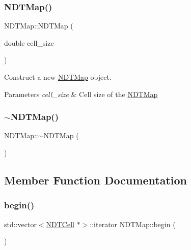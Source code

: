 \subsubsection{\texorpdfstring{N\+D\+T\+Map()}{NDTMap()}}
{\footnotesize\ttfamily N\+D\+T\+Map\+::\+N\+D\+T\+Map (\begin{DoxyParamCaption}\item[{double}]{cell\+\_\+size }\end{DoxyParamCaption})\hspace{0.3cm}{\ttfamily [explicit]}}



Construct a new \hyperlink{classNDTMap}{N\+D\+T\+Map} object. 


\begin{DoxyParams}{Parameters}
{\em cell\+\_\+size} & Cell size of the \hyperlink{classNDTMap}{N\+D\+T\+Map} \\
\hline
\end{DoxyParams}
\mbox{\label{classNDTMap_af6e42f0f13a33e6027e14635631e1312}} 
\subsubsection{\texorpdfstring{$\sim$\+N\+D\+T\+Map()}{~NDTMap()}}
{\footnotesize\ttfamily N\+D\+T\+Map\+::$\sim$\+N\+D\+T\+Map (\begin{DoxyParamCaption}{ }\end{DoxyParamCaption})}



\subsection{Member Function Documentation}
\mbox{\label{classNDTMap_a94a3a8740a68aafca85872153ef68a40}} 
\subsubsection{\texorpdfstring{begin()}{begin()}\hspace{0.1cm}{\footnotesize\ttfamily [1/2]}}
{\footnotesize\ttfamily std\+::vector$<$\hyperlink{classNDTCell}{N\+D\+T\+Cell} $\ast$$>$\+::iterator N\+D\+T\+Map\+::begin (\begin{DoxyParamCaption}{ }\end{DoxyParamCaption})\hspace{0.3cm}{\ttfamily [inline]}}



